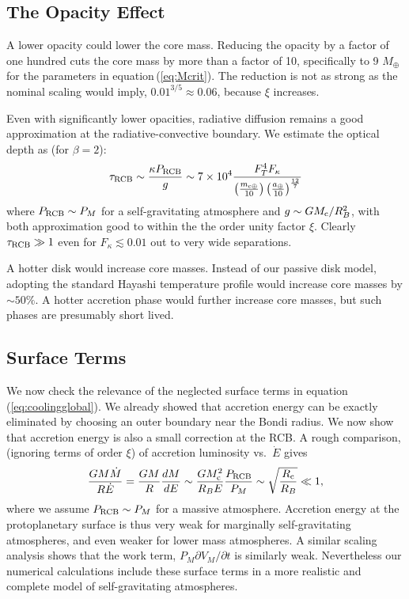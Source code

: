 \documentclass[apj]{emulateapj}
\newcommand{\p}{\partial}
\newcommand{\Eq}[1]{equation\,(\ref{#1})}
\newcommand{\co}{_{\rm c}}
\newcommand{\cb}{_{\rm RCB}}
\newcommand{\surf}{_M}
\newcommand{\mc}{m_{\rm c \oplus}}
\newcommand{\au}{a_\oplus}
\begin{document}
\subsection{The Opacity Effect}
A  lower opacity  could lower the core mass.  Reducing the opacity by a factor of one hundred cuts the core mass by more than a factor of 10, specifically to 9 $M_\oplus$ for the parameters in \Eq{eq:Mcrit}.  The reduction is not  as strong as the nominal scaling would imply, $0.01^{3/5} \approx 0.06$, because $\xi$ increases.

Even with significantly lower opacities, radiative diffusion remains a good approximation at the radiative-convective boundary.  We estimate the optical depth as (for $\beta = 2$):
\begin{equation}
\tau\cb \sim {\kappa P\cb \over g} \sim 7 \times 10^4 {F_T^4 F_\kappa \over \left(\mc \over 10 \right) \left(\au \over 10\right)^{12 \over 7}} 
\end{equation} 
where $P\cb \sim P_M$ for a self-gravitating atmosphere and $g \sim G M\co/R_B^2$, with both approximation good to within the the order unity factor $\xi$.  Clearly $\tau\cb \gg 1$ even for $F_\kappa \lesssim 0.01$ out to very wide separations.

A hotter disk would increase core masses.  Instead of our passive disk model, adopting the standard Hayashi temperature profile would increase core masses by $\sim 50\%$.  A hotter accretion phase would further increase core masses, but such phases are presumably short lived.

\subsection{Surface Terms}
We now check the relevance of the neglected surface terms in \Eq{eq:coolingglobal}.  We already showed that accretion energy can be exactly eliminated by choosing an outer boundary near the Bondi radius.   We now show that accretion energy is also a small correction at the RCB.   A rough comparison, (ignoring terms of order $\xi$) of  accretion luminosity vs.\ $\dot{E}$ gives
\begin{equation}
{G M \dot{M} \over R \dot{E}} = {G M  \over R}{dM \over dE} \sim {G M\co^2 \over R_B E}{P\cb \over P_M} \sim \sqrt{R\co \over R_B} \ll 1,
\end{equation} 
where we assume $P\cb \sim P_M$  for a massive atmosphere.  Accretion energy at the protoplanetary surface is thus very weak for marginally self-gravitating atmospheres, and even weaker for lower mass atmospheres.  A similar scaling analysis shows that the work term, $P\surf \p V\surf/\p t$ is similarly weak.  Nevertheless our numerical calculations include these surface terms in a more realistic and complete model of self-gravitating atmospheres.
\end{document}
